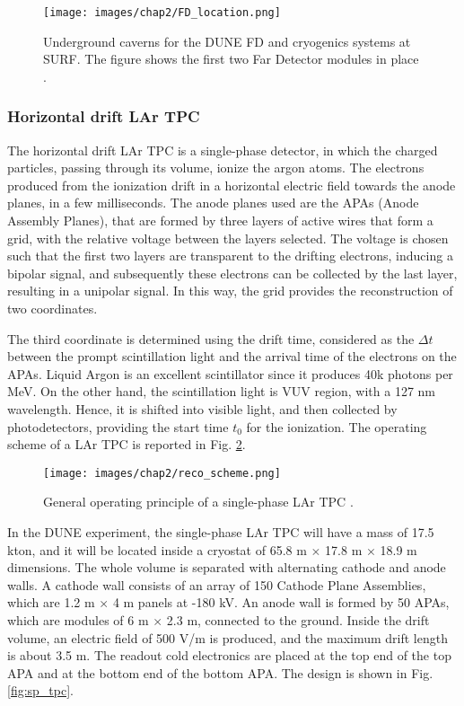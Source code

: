\begin{figure}
    \centering
    \texttt{[image: images/chap2/FD\_location.png]}
    \caption{Underground caverns for the DUNE FD and cryogenics systems at SURF. The figure shows the first two Far Detector modules in place \cite{fd_tdr_vol1}.}
    \label{fig:FD_location}
\end{figure}

\subsubsection{Horizontal drift LAr TPC}
The horizontal drift LAr TPC is a single-phase detector, in which the charged particles, passing through its volume, ionize the argon atoms. The electrons produced from the ionization drift in a horizontal electric field towards the anode planes, in a few milliseconds. The anode planes used are the APAs (Anode Assembly Planes), that are formed by three layers of active wires that form a grid, with the relative voltage between the layers selected. The voltage is chosen such that the first two layers are transparent to the drifting electrons, inducing a bipolar signal, and subsequently these electrons can be collected by the last layer, resulting in a unipolar signal. In this way, the grid provides the reconstruction of two coordinates. 

The third coordinate is determined using the drift time, considered as the $\Delta t$ between the prompt scintillation light and the arrival time of the electrons on the APAs. Liquid Argon is an excellent scintillator since it produces 40k photons per MeV. On the other hand, the scintillation light is VUV region, with a 127 nm wavelength. Hence, it is shifted into visible light, and then collected by photodetectors, providing the start time $t_0$ for the ionization. The operating scheme of a LAr TPC is reported in Fig. \ref{fig:operating_LArTPC}.

\begin{figure}
    \centering
    \texttt{[image: images/chap2/reco\_scheme.png]}
    \caption{General operating principle of a single-phase LAr TPC \cite{fd_tdr_vol1}.}
    \label{fig:operating_LArTPC}
\end{figure}

In the DUNE experiment, the single-phase LAr TPC will have a mass of 17.5 kton, and it will be located inside a cryostat of 65.8 m $\times$ 17.8 m $\times$ 18.9 m dimensions. The whole volume is separated with alternating cathode and anode walls. A cathode wall consists of an array of 150 Cathode Plane Assemblies, which are 1.2 m $\times$ 4 m panels at -180 kV. An anode wall is formed by 50 APAs, which are modules of 6 m $\times$ 2.3 m, connected to the ground. Inside the drift volume, an electric field of 500 V/m is produced, and the maximum drift length is about 3.5 m. The readout cold electronics are placed at the top end of the top APA and at the bottom end of the bottom APA. The design is shown in Fig. \ref{fig:sp_tpc}. 

